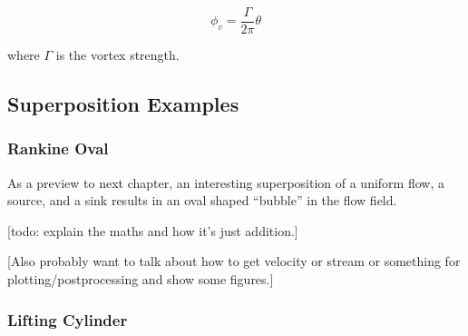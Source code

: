 \begin{equation}
	\label{eqn:vortexflow}
	\phi_v = \frac{\Gamma}{2\pi} \theta
\end{equation}

\noindent where \(\Gamma\) is the vortex strength.


\subsection{Superposition Examples}

\subsubsection{Rankine Oval}
As a preview to next chapter, an interesting superposition of a uniform flow, a source, and a sink results in an oval shaped ``bubble'' in the flow field.

[todo: explain the maths and how it's just addition.]

[Also probably want to talk about how to get velocity or stream or something for plotting/postprocessing and show some figures.]

\subsubsection{Lifting Cylinder}
